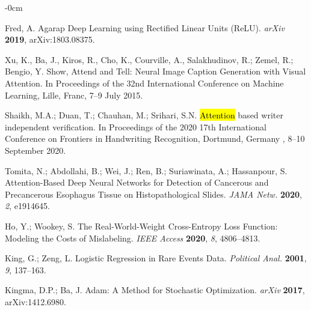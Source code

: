 \documentclass[sensors,article,accept,pdftex,moreauthors]{Definitions/mdpi}
\begin{document}
\begin{adjustwidth}{-\extralength}{0cm}
\begin{thebibliography}{999}
Fred, A. Agarap Deep Learning using Rectified Linear Units (ReLU).
{\em arXiv} 
{\bf 2019}, arXiv:1803.08375.

Xu, K., Ba, J., Kiros, R., Cho, K., Courville, A., Salakhudinov, R.; Zemel, R.; Bengio, Y. Show, Attend and Tell: Neural Image Caption Generation with Visual Attention. In Proceedings of the 32nd International Conference on Machine Learning, Lille, Franc, 7--9 July 2015.

Shaikh, M.A.; Duan, T.; Chauhan, M.; Srihari, S.N. \hl{Attention} %
 based writer independent verification. In Proceedings of the 2020 17th International Conference on Frontiers in Handwriting Recognition,  Dortmund, Germany , 8--10 September
{2020}.

Tomita, N.; Abdollahi, B.; Wei, J.; Ren, B.; Suriawinata, A.; Hassanpour, S. Attention-Based Deep Neural Networks for Detection of Cancerous and Precancerous Esophagus Tissue on Histopathological Slides.
{\em JAMA Netw.} 
{\bf 2020}, \emph{2}, e1914645.

Ho, Y.; Wookey, S. The Real-World-Weight Cross-Entropy Loss Function: Modeling the Costs of Mislabeling.
\emph{IEEE Access }
{\bf 2020}, \emph{8}, 4806--4813.

King, G.; Zeng, L. Logistic Regression in Rare Events Data.
{\em Political Anal.} 
{\bf 2001}, \emph{9}, 137--163.

Kingma, D.P.; Ba, J. Adam: A Method for Stochastic Optimization.
{\em arXiv} 
{\bf 2017}, arXiv:1412.6980.




		\end{thebibliography}
		
		

\end{adjustwidth}
\end{document}
